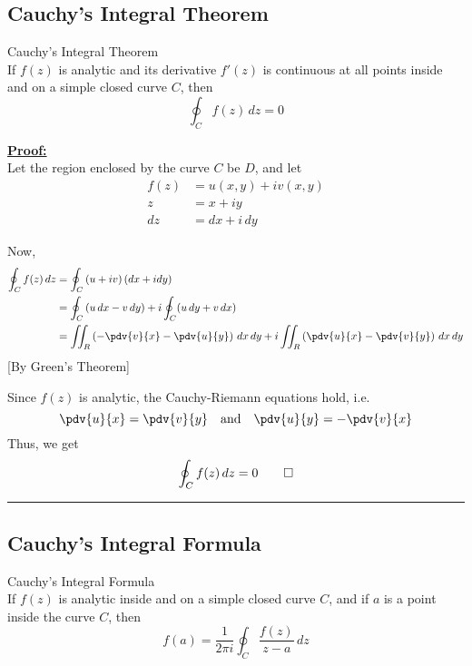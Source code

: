 \subsection{Cauchy's Integral Theorem}
\begin{theorem}{Cauchy's Integral Theorem}{}
    \\If $f(z)$ is analytic and its derivative $f'(z)$ is continuous at all points inside and on a simple closed curve $C$, then
    \begin{equation}
        \oint_C f(z) \, dz = 0
    \end{equation}
\end{theorem}

\underline{\textbf{Proof:}} \\
Let the region enclosed by the curve $C$ be $D$, and let
\begin{align*}
    f(z) &= u(x,y) + iv(x,y) \\
    z &= x + iy \\
    dz &= dx + i \, dy
\end{align*}

Now,
\begin{align*}
    \oint_C {f(z) \, dz} &= \oint_C {\left( u+iv \right)\left( dx + idy \right)}  \\
    &= \oint_C {(u \, dx - v \, dy) + i \oint_C (u \, dy + v \, dx)} \\
    &= \iint_R \left( -\pdv{v}{x} - \pdv{u}{y} \right) \, dx \, dy + i \iint_R \left( \pdv{u}{x} - \pdv{v}{y} \right) \, dx \, dy
\end{align*}
\hfill[By Green's Theorem]

Since $f(z)$ is analytic, the Cauchy-Riemann equations hold, i.e.
\begin{equation*}
    \pdv{u}{x} = \pdv{v}{y} 
    \quad \text{and} \quad
    \pdv{u}{y} = -\pdv{v}{x}
\end{equation*}
Thus, we get \[
    \oint_C f(z) \, dz = 0 \qed
\] 

\vspace{20pt}\rule{3in}{1pt}


\subsection{Cauchy's Integral Formula}
\begin{theorem}{Cauchy's Integral Formula}{}
    \\If $f(z)$ is analytic inside and on a simple closed curve $C$, and if $a$ is a point inside the curve $C$, then
    \begin{equation}
        f(a) = \frac{1}{2\pi i} \oint_C \frac{f(z)}{z-a} \, dz
    \end{equation}
\end{theorem}

